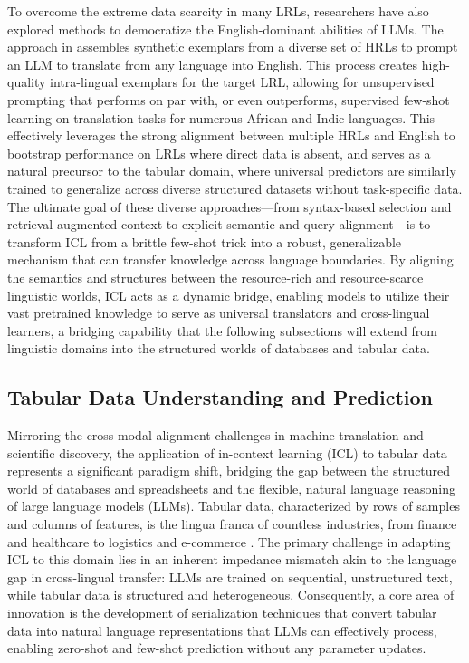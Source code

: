 \documentclass[11pt]{article}
\begin{document}
To overcome the extreme data scarcity in many LRLs, researchers have also explored methods to democratize the English-dominant abilities of LLMs. The approach in \cite{ref543} assembles synthetic exemplars from a diverse set of HRLs to prompt an LLM to translate from any language into English. This process creates high-quality intra-lingual exemplars for the target LRL, allowing for unsupervised prompting that performs on par with, or even outperforms, supervised few-shot learning on translation tasks for numerous African and Indic languages. This effectively leverages the strong alignment between multiple HRLs and English to bootstrap performance on LRLs where direct data is absent, and serves as a natural precursor to the tabular domain, where universal predictors are similarly trained to generalize across diverse structured datasets without task-specific data. The ultimate goal of these diverse approaches---from syntax-based selection and retrieval-augmented context to explicit semantic and query alignment---is to transform ICL from a brittle few-shot trick into a robust, generalizable mechanism that can transfer knowledge across language boundaries. By aligning the semantics and structures between the resource-rich and resource-scarce linguistic worlds, ICL acts as a dynamic bridge, enabling models to utilize their vast pretrained knowledge to serve as universal translators and cross-lingual learners, a bridging capability that the following subsections will extend from linguistic domains into the structured worlds of databases and tabular data.

\subsection{Tabular Data Understanding and Prediction}

Mirroring the cross-modal alignment challenges in machine translation and scientific discovery, the application of in-context learning (ICL) to tabular data represents a significant paradigm shift, bridging the gap between the structured world of databases and spreadsheets and the flexible, natural language reasoning of large language models (LLMs). Tabular data, characterized by rows of samples and columns of features, is the lingua franca of countless industries, from finance and healthcare to logistics and e-commerce \cite{ref544}. The primary challenge in adapting ICL to this domain lies in an inherent impedance mismatch akin to the language gap in cross-lingual transfer: LLMs are trained on sequential, unstructured text, while tabular data is structured and heterogeneous. Consequently, a core area of innovation is the development of serialization techniques that convert tabular data into natural language representations that LLMs can effectively process, enabling zero-shot and few-shot prediction without any parameter updates.
\end{document}
